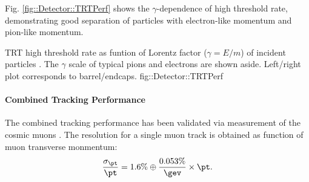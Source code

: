 Fig. \ref{fig::Detector::TRTPerf} shows the $\gamma$-dependence of high threshold rate, demonstrating good separation of particles with electron-like momentum and pion-like momentum.

{TRT high threshold rate as funtion of Lorentz factor ($\gamma=E/m$) of incident particles \cite{TRTPub}.
The $\gamma$ scale of typical pions and electrons are shown aside. Left/right plot corresponds to barrel/endcaps.}
{fig::Detector::TRTPerf}


\paragraph{Combined Tracking Performance}
The combined tracking performance has been validated via measurement of the cosmic muons \cite{ATLAScosmicPerf}. 
The resolution for a single muon track is obtained as function of muon transverse monmentum: 
\begin{align}
\frac{\sigma_{\pt}}{\pt} = 1.6\% \oplus \frac{0.053\%}{\gev}\times \pt.  \label{eq::Detector::perf_ID}
\end{align}



